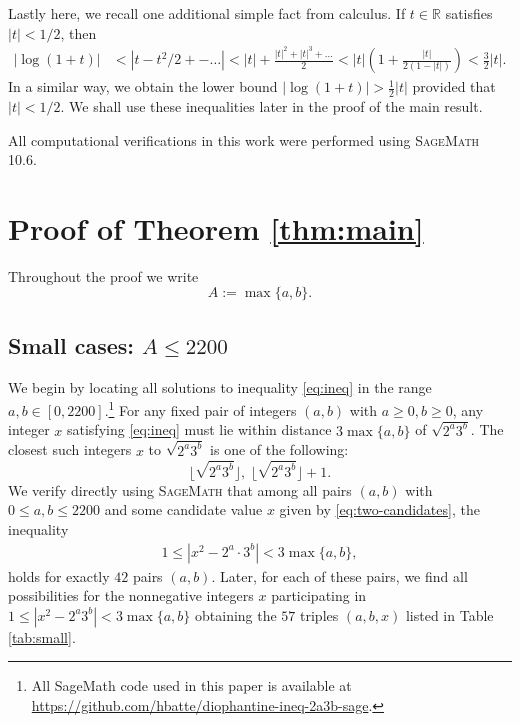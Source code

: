 \documentclass[11pt,a4paper]{article}
\numberwithin{equation}{section}
\numberwithin{table}{section}
\numberwithin{figure}{section}
\begin{document}
Lastly here, we recall one additional simple fact from calculus. If $t\in \mathbb{R}$ satisfies $|t|<1/2$, then 
\begin{align}\label{eq:calc}
	|\log(1+t)|&<|t-t^2/2+-\dots|
	<|t|+\frac{|t|^2+|t|^3+\dots}2
	<|t|\left(1+\frac{|t|}{2(1-|t|)}\right)<\frac 32 |t|.
\end{align}
In a similar way, we obtain the lower bound $|\log(1+t)|>\frac 12 |t|$ provided that $|t|<1/2$. We shall use these inequalities later in the proof of the main result.

All computational verifications in this work were performed using \textsc{SageMath 10.6}.


\section{Proof of Theorem \ref{thm:main}}\label{sec:proof}

Throughout the proof we write
\begin{equation*}
	A := \max\{a, b\}.
\end{equation*}

\subsection{Small cases: $A \leq 2200$}

We begin by locating all solutions to inequality \eqref{eq:ineq} in the range $a, b \in [0, 2200]$.\footnote{\label{fn:github} All SageMath code used in this paper is available at \url{https://github.com/hbatte/diophantine-ineq-2a3b-sage}.} For any fixed pair  of integers $(a, b)$ with $a\ge 0, b \geq 0$, any integer $x$ satisfying \eqref{eq:ineq} must lie within distance
$3\max\{a,b\}$ of $\sqrt{2^a 3^b}$. The closest such integers $x$ to ${\sqrt{2^a3^b}}$ is one of the following: 
\begin{equation}\label{eq:two-candidates}
	\lfloor\sqrt{2^a 3^b}\rfloor,\;
	\lfloor\sqrt{2^a 3^b}\rfloor + 1.
\end{equation}
We verify directly using \textsc{SageMath} that among all pairs $(a,b)$ with $0 \leq a, b \leq 2200$ and some candidate value $x$ given by \eqref{eq:two-candidates}, the inequality
\begin{align*}	
	1 \leq |x^2 - 2^a \cdot 3^b| < 3\max\{a,b\},
\end{align*}
holds for exactly $42$ pairs $(a,b)$. Later, for each of these pairs, we find all possibilities for the nonnegative integers $x$ participating in $1\le |x^2-2^a3^b|<3\max\{a,b\}$ obtaining
the $57$ triples $(a, b, x)$ listed in
Table \ref{tab:small}. 
\end{document}
